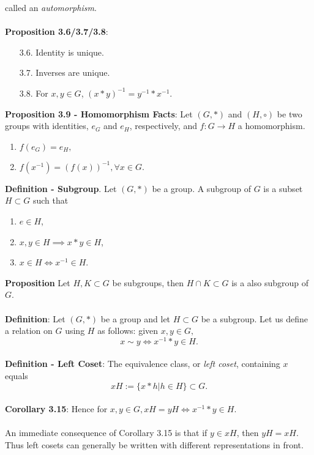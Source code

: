 \documentclass{article}
\begin{document}
called an \textit{automorphism}. \\ \\
\textbf{Proposition 3.6/3.7/3.8}: \begin{enumerate}
    \item[3.6.] Identity is unique.
    \item[3.7.] Inverses are unique.
    \item[3.8.] For $x, y \in G$, $(x * y)^{-1} = y^{-1} * x^{-1}$.
\end{enumerate} $ $ \\
\textbf{Proposition 3.9 - Homomorphism Facts}: Let $(G, *)$ and $(H, \circ)$ be two groups with identities, $e_G$ and $e_H$, respectively, and $f: G \rightarrow H$ a homomorphism. \begin{enumerate}
    \item $f(e_G) = e_H,$
    \item $f(x^{-1}) = (f(x))^{-1}, \forall x \in G.$
\end{enumerate} $ $ \\
\textbf{Definition - Subgroup}. Let $(G, *)$ be a group. A subgroup of $G$ is a subset $H \subset G$ such that \begin{enumerate}
    \item $e \in H$,
    \item $x, y \in H \implies x * y \in H$,
    \item $x \in H \iff x^{-1} \in H$.
\end{enumerate} $ $ \\
\textbf{Proposition} Let $H, K \subset G$ be subgroups, then $H \cap K \subset G$ is a also subgroup of $G$. \\ \\
\textbf{Definition}: Let $(G, *)$ be a group and let $H \subset G$ be a subgroup. Let us define a relation on $G$ using $H$ as follows: given $x, y \in G,$ $$x \sim y \iff x ^{-1} * y \in H.$$ \\
\textbf{Definition - Left Coset}: The equivalence class, or \textit{left coset}, containing $x$ equals $$xH := \{x * h | h \in H\} \subset G.$$ \\
\textbf{Corollary 3.15}: Hence for $x, y \in G, xH = yH \iff x^{-1} * y \in H$. \\ \\
An immediate consequence of Corollary 3.15 is that if $y \in xH$, then $yH = xH$. Thus left cosets can generally be written with different representations in front. \\ \\
\end{document}

